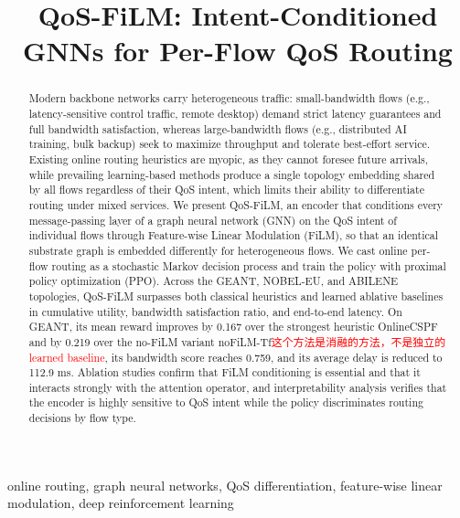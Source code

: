 \documentclass[lettersize,journal]{IEEEtran}
\title{QoS-FiLM: Intent-Conditioned GNNs for Per-Flow QoS Routing}
\author{\IEEEauthorblockN{Xiaolong Cui and Yuwei Deng\IEEEauthorrefmark{1}}
\IEEEauthorblockA{School of Computer and Communication Engineering,
University of Science and Technology Beijing, Beijing 100083, China}
\IEEEauthorblockA{\IEEEauthorrefmark{1}(e-mail: dengyuwei2025@163.com)}}
\begin{document}
\maketitle

\begin{abstract}
Modern backbone networks carry heterogeneous traffic: small-bandwidth flows (e.g., latency-sensitive control traffic, remote desktop) demand strict latency guarantees and full bandwidth satisfaction, whereas large-bandwidth flows (e.g., distributed AI training, bulk backup) seek to maximize throughput and tolerate best-effort service. Existing online routing heuristics are myopic, as they cannot foresee future arrivals, while prevailing learning-based methods produce a single topology embedding shared by all flows regardless of their QoS intent, which limits their ability to differentiate routing under mixed services. We present QoS-FiLM, an encoder that conditions every message-passing layer of a graph neural network (GNN) on the QoS intent of individual flows through Feature-wise Linear Modulation (FiLM), so that an identical substrate graph is embedded differently for heterogeneous flows. We cast online per-flow routing as a stochastic Markov decision process and train the policy with proximal policy optimization (PPO). Across the GEANT, NOBEL-EU, and ABILENE topologies, QoS-FiLM surpasses both classical heuristics and learned ablative baselines in cumulative utility, bandwidth satisfaction ratio, and end-to-end latency. On GEANT, its mean reward improves by 0.167 over the strongest heuristic OnlineCSPF and by 0.219 over the no-FiLM variant noFiLM-Tf\textcolor{red}{这个方法是消融的方法，不是独立的learned baseline}, its bandwidth score reaches 0.759, and its average delay is reduced to 112.9 ms. Ablation studies confirm that FiLM conditioning is essential and that it interacts strongly with the attention operator, and interpretability analysis verifies that the encoder is highly sensitive to QoS intent while the policy discriminates routing decisions by flow type.
\end{abstract}

\begin{IEEEkeywords}
online routing, graph neural networks, QoS differentiation, feature-wise linear modulation, deep reinforcement learning
\end{IEEEkeywords}










\end{document}
